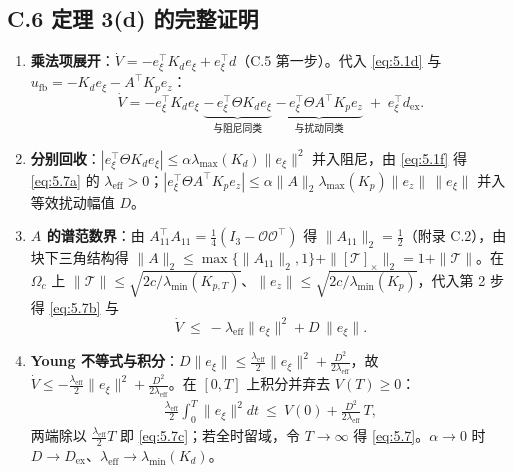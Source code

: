 \subsection*{C.6 定理 3(d) 的完整证明}

\begin{enumerate}[leftmargin=2em]
  \item \textbf{乘法项展开}：$\dot V=-e_\xi^\top K_de_\xi+e_\xi^\top d$（C.5 第一步）。代入 \eqref{eq:5.1d} 与 $u_{\mathrm{fb}}=-K_de_\xi-A^\top K_pe_z$：
  \begin{equation*}
  \dot V=-e_\xi^\top K_de_\xi\;\underbrace{-\,e_\xi^\top\Theta K_de_\xi}_{\text{与阻尼同类}}\;\underbrace{-\,e_\xi^\top\Theta A^\top K_pe_z}_{\text{与扰动同类}}\;+\;e_\xi^\top d_{\mathrm{ex}} .
  \end{equation*}

  \item \textbf{分别回收}：$|e_\xi^\top\Theta K_de_\xi|\le\alpha\lambda_{\max}(K_d)\|e_\xi\|^2$ 并入阻尼，由 \eqref{eq:5.1f} 得 \eqref{eq:5.7a} 的 $\lambda_{\mathrm{eff}}>0$；$|e_\xi^\top\Theta A^\top K_pe_z|\allowbreak\le\alpha\|A\|_2\allowbreak\lambda_{\max}(K_p)\|e_z\|\,\|e_\xi\|$ 并入等效扰动幅值 $D$。

  \item \textbf{$A$ 的谱范数界}：由 $A_{11}^\top A_{11}=\tfrac14(I_3-\mathcal O\mathcal O^\top)$ 得 $\|A_{11}\|_2=\tfrac12$（附录 C.2），由块下三角结构得 $\|A\|_2\le\max\{\|A_{11}\|_2,1\}+\|[\mathcal T]_\times\|_2=1+\|\mathcal T\|$。在 $\Omega_c$ 上 $\|\mathcal T\|\le\sqrt{2c/\lambda_{\min}(K_{p,T})}$、$\|e_z\|\le\sqrt{2c/\lambda_{\min}(K_p)}$，代入第 2 步得 \eqref{eq:5.7b} 与
  \begin{equation}
  \dot V\ \le\ -\lambda_{\mathrm{eff}}\|e_\xi\|^2+D\,\|e_\xi\| .
  \tag{5.7d}\label{eq:5.7d}
  \end{equation}

  \item \textbf{Young 不等式与积分}：$D\|e_\xi\|\le\tfrac{\lambda_{\mathrm{eff}}}2\|e_\xi\|^2+\tfrac{D^2}{2\lambda_{\mathrm{eff}}}$，故 $\dot V\le-\tfrac{\lambda_{\mathrm{eff}}}2\|e_\xi\|^2+\tfrac{D^2}{2\lambda_{\mathrm{eff}}}$。在 $[0,T]$ 上积分并弃去 $V(T)\ge0$：
  \begin{equation*}
  \begin{gathered}
  \tfrac{\lambda_{\mathrm{eff}}}2\int_0^T\|e_\xi\|^2dt
  \ \le\ V(0)+\tfrac{D^2}{2\lambda_{\mathrm{eff}}}\,T ,
  \end{gathered}
  \end{equation*}
  两端除以 $\tfrac{\lambda_{\mathrm{eff}}}2T$ 即 \eqref{eq:5.7c}；若全时留域，令 $T\to\infty$ 得 \eqref{eq:5.7}。$\alpha\to0$ 时 $D\to D_{\mathrm{ex}}$、$\lambda_{\mathrm{eff}}\to\lambda_{\min}(K_d)$。
\end{enumerate}

